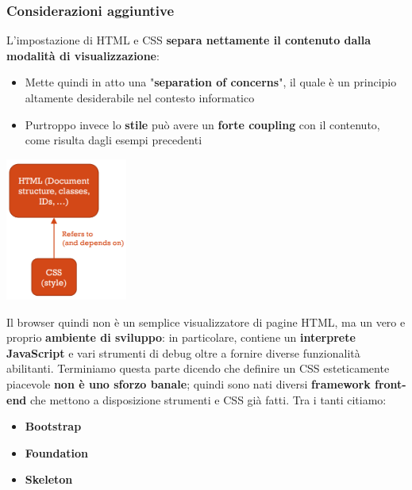 \documentclass[12pt]{article}
\begin{document}
\subsubsection{Considerazioni aggiuntive}
L'impostazione di HTML e CSS \textbf{separa nettamente il contenuto dalla modalità di visualizzazione}:
\begin{itemize}
    \item Mette quindi in atto una "\textbf{separation of concerns}", il quale è un principio altamente desiderabile nel contesto informatico
    \item Purtroppo invece lo \textbf{stile} può avere un \textbf{forte coupling} con il contenuto, come risulta dagli esempi precedenti
\end{itemize}
\begin{center}
    \includegraphics[width = 0.30\textwidth]{Images/163.PNG}
\end{center}
Il browser quindi non è un semplice visualizzatore di pagine HTML, ma un vero e proprio \textbf{ambiente di sviluppo}: in particolare, contiene
un \textbf{interprete JavaScript} e vari strumenti di debug oltre a fornire diverse funzionalità abilitanti. \newline
Terminiamo questa parte dicendo che definire un CSS esteticamente piacevole \textbf{non è uno sforzo banale}; quindi sono nati diversi \textbf{framework front-end} che mettono a disposizione strumenti e CSS già
fatti. Tra i tanti citiamo:
\begin{itemize}
    \item \textbf{Bootstrap}
    \item \textbf{Foundation}
    \item \textbf{Skeleton}
\end{itemize}
\end{document}
